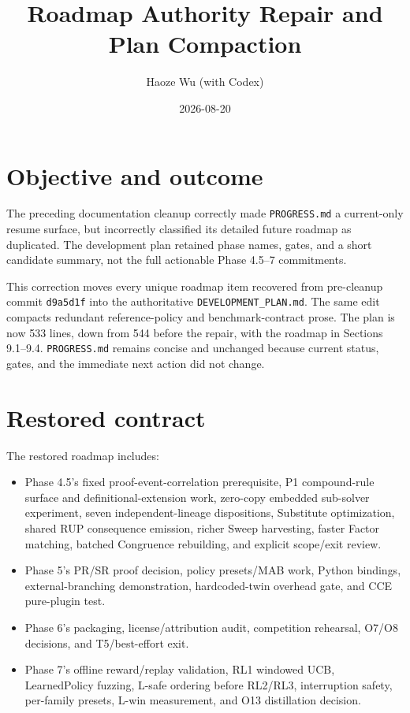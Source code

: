 \documentclass[11pt]{article}
\title{Roadmap Authority Repair and Plan Compaction}
\author{Haoze Wu (with Codex)}
\date{2026-08-20}
\begin{document}
\maketitle

\section{Objective and outcome}

The preceding documentation cleanup correctly made \texttt{PROGRESS.md} a
current-only resume surface, but incorrectly classified its detailed future
roadmap as duplicated.  The development plan retained phase names, gates, and a
short candidate summary, not the full actionable Phase 4.5--7 commitments.

This correction moves every unique roadmap item recovered from pre-cleanup
commit \texttt{d9a5d1f} into the authoritative \texttt{DEVELOPMENT\_PLAN.md}.
The same edit compacts redundant reference-policy and benchmark-contract prose.
The plan is now 533 lines, down from 544 before the repair, with the roadmap in
Sections 9.1--9.4.  \texttt{PROGRESS.md} remains concise and unchanged because
current status, gates, and the immediate next action did not change.

\section{Restored contract}

The restored roadmap includes:

\begin{itemize}
\item Phase 4.5's fixed proof-event-correlation prerequisite, P1 compound-rule
  surface and definitional-extension work, zero-copy embedded sub-solver
  experiment, seven independent-lineage dispositions, Substitute optimization,
  shared RUP consequence emission, richer Sweep harvesting, faster Factor
  matching, batched Congruence rebuilding, and explicit scope/exit review.
\item Phase 5's PR/SR proof decision, policy presets/MAB work, Python bindings,
  external-branching demonstration, hardcoded-twin overhead gate, and CCE
  pure-plugin test.
\item Phase 6's packaging, license/attribution audit, competition rehearsal,
  O7/O8 decisions, and T5/best-effort exit.
\item Phase 7's offline reward/replay validation, RL1 windowed UCB,
  LearnedPolicy fuzzing, L-safe ordering before RL2/RL3, interruption safety,
  per-family presets, L-win measurement, and O13 distillation decision.
\end{itemize}
\end{document}
